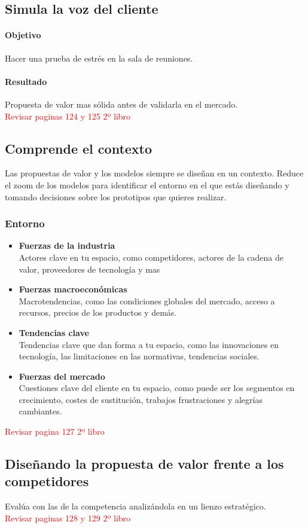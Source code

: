 \documentclass[11pt]{book}
\begin{document}
\subsection{Simula la voz del cliente}
\paragraph{Objetivo}
Hacer una prueba de estrés en la sala de reuniones.
\paragraph{Resultado}
Propuesta de valor mas sólida antes de validarla en el mercado.\\
\textcolor{red}{Revisar paginas 124 y 125 2º libro}
\subsection{Comprende el contexto}
Las propuestas de valor y los modelos siempre se diseñan en un contexto. Reduce el zoom de los modelos para identificar el entorno en el que estás diseñando y tomando decisiones sobre los prototipos que quieres realizar.
\subsubsection{Entorno}
\begin{itemize}
\item \textbf{ Fuerzas de la industria }\\
Actores clave en tu espacio, como competidores, actores de la cadena de valor, proveedores de tecnología y mas
\item \textbf{ Fuerzas macroeconómicas }\\
Macrotendencias, como las condiciones globales del mercado, acceso a recursos, precios de los productos y demás.
\item \textbf{ Tendencias clave }\\
Tendencias clave que dan forma a tu espacio, como las innovaciones en tecnología, las limitaciones en las normativas, tendencias sociales.
\item \textbf{ Fuerzas del mercado }\\
Cuestiones clave del cliente en tu espacio, como puede ser los segmentos en crecimiento, costes de sustitución, trabajos frustraciones y alegrías cambiantes.
\end{itemize}
\textcolor{red}{Revisar pagina 127 2º libro}
\subsection{Diseñando la propuesta de valor frente a los competidores}
Evalúa con las de la competencia analizándola en un lienzo estratégico. \\
\textcolor{red}{Revisar paginas 128 y 129 2º libro}
\end{document}
